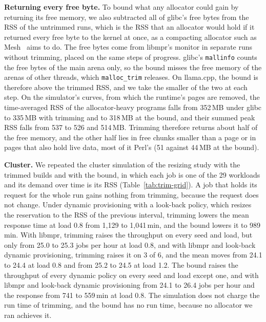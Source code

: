 \documentclass[11pt]{article}
\newcommand{\tabref}[1]{Table~\ref{#1}}
\begin{document}
\textbf{Returning every free byte.} To bound what any allocator could gain by returning its free memory, we also
subtracted all of glibc's free bytes from the RSS of the untrimmed runs, which is the RSS that an allocator would
hold if it returned every free byte to the kernel at once, as a compacting allocator such as Mesh~\cite{Powers2019Mesh}
aims to do. The free bytes come from libmpr's monitor in separate runs without trimming, placed on the same steps of
progress. glibc's \texttt{mallinfo} counts the free bytes of the main arena only, so the bound misses the free memory
of the arenas of other threads, which \texttt{malloc\_trim} releases. On llama.cpp, the bound is therefore above the
trimmed RSS, and we take the smaller of the two at each step. On the simulator's curves, from which the runtime's
pages are removed, the time-averaged RSS of the allocator-heavy programs falls from 352\,MB under glibc to 335\,MB
with trimming and to 318\,MB at the bound, and their summed peak RSS falls from 537 to 526 and 514\,MB. Trimming
therefore returns about half of the free memory, and the other half lies in free chunks smaller than a page or in
pages that also hold live data, most of it Perl's (51 against 44\,MB at the bound).

\begin{table}[t]
\centering
\small
\caption{Cluster simulation of the resizing study (DMSched-Sim, 3{,}000 jobs, the RSS as the job's truth): throughput
and mean response time of each policy with glibc's RSS, with trimming at $s = 0.1$ and at the bound of returning
every free byte, mean of 3 seeds, and the number of the 6 seed and load pairs on which the throughput is higher than
with glibc's RSS. The standard deviation of the response over seeds is about 200\,min for the dynamic policies.}
\label{tab:trim-grid}
\setlength{\tabcolsep}{4pt}

\end{table}

\textbf{Cluster.} We repeated the cluster simulation of the resizing study with the trimmed builds and with the
bound, in which each job is one of the 29 workloads and its demand over time is its RSS (\tabref{tab:trim-grid}). A
job that holds its request for the whole run gains nothing from trimming, because the request does not change. Under
dynamic provisioning with a look-back policy, which resizes the reservation to the RSS of the previous interval,
trimming lowers the mean response time at load 0.8 from 1{,}129 to 1{,}041\,min, and the bound lowers it to
989\,min. With libmpr, trimming raises the throughput on every seed and load, but only from 25.0 to 25.3 jobs per hour
at load 0.8, and with libmpr and look-back dynamic provisioning, trimming raises it on 3 of 6, and the mean moves from 24.1
to 24.4 at load 0.8 and from 25.2 to 24.5 at load 1.2. The bound raises the throughput of every dynamic policy on every seed
and load except one, and with libmpr and look-back dynamic provisioning from 24.1 to 26.4 jobs per hour and the
response from 741 to 559\,min at load 0.8. The simulation does not charge the run time of trimming, and the bound has
no run time, because no allocator we ran achieves it.
\end{document}
